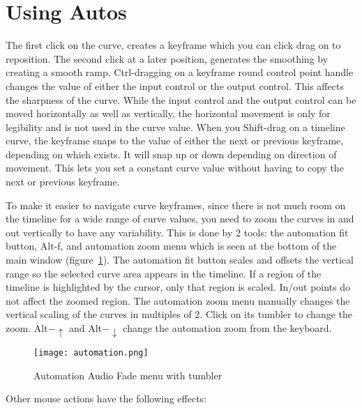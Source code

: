 \section{Using Autos}%
\label{sec:using_autos}

The first click on the curve, creates a keyframe which you can click drag on to reposition.  The second click at a later position, generates the smoothing by creating a smooth ramp.  Ctrl-dragging on a keyframe round control point handle changes the value of either the input control or the output control.  This affects the sharpness of the curve.  While the input control and the output control can be moved horizontally as well as vertically, the horizontal movement is only for legibility and is not used in the curve value.  When you Shift-drag on a timeline curve, the keyframe snaps to the value of either the next or previous keyframe, depending on which exists.  It will snap up or down depending on direction of movement.  This lets you set a constant curve value without having to copy the next or previous keyframe.

To make it easier to navigate curve keyframes, since there is not much room on the timeline for a wide range of curve values, you need to zoom the curves in and out vertically to have any variability.  This is done by 2 tools: the automation fit button, Alt-f, and automation zoom menu which is seen at the bottom of the main window (figure~\ref{fig:automation}). The automation fit button scales and offsets the vertical range so the selected curve area appears in the timeline.  If a region of the timeline is highlighted by the cursor, only that region is scaled.  In/out points do not affect the zoomed region.  The automation zoom menu manually changes the vertical scaling of the curves in multiples of 2.  Click on its tumbler to change the zoom.  Alt$-\uparrow$ and Alt$-\downarrow$ change the automation zoom from the keyboard.

\begin{figure}[htpb]
    \centering
    \texttt{[image: automation.png]}
    \caption{Automation Audio Fade menu with tumbler}
    \label{fig:automation}
\end{figure}

\noindent Other mouse actions have the following effects:

